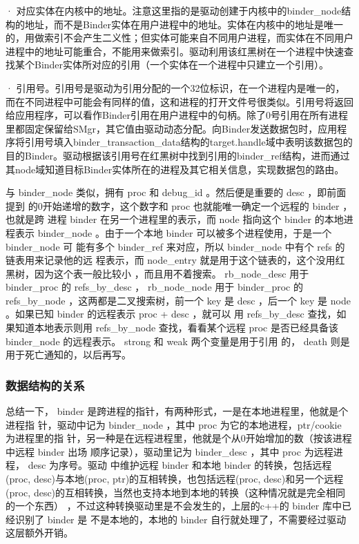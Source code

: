 \documentclass[a4paper,11pt]{article}
\begin{document}
· 对应实体在内核中的地址。注意这里指的是驱动创建于内核中的binder_node结构的地址，而不是Binder实体在用户进程中的地址。实体在内核中的地址是唯一的，用做索引不会产生二义性；但实体可能来自不同用户进程，而实体在不同用户进程中的地址可能重合，不能用来做索引。驱动利用该红黑树在一个进程中快速查找某个Binder实体所对应的引用（一个实体在一个进程中只建立一个引用）。

· 引用号。引用号是驱动为引用分配的一个32位标识，在一个进程内是唯一的，而在不同进程中可能会有同样的值，这和进程的打开文件号很类似。引用号将返回给应用程序，可以看作Binder引用在用户进程中的句柄。除了0号引用在所有进程里都固定保留给SMgr，其它值由驱动动态分配。向Binder发送数据包时，应用程序将引用号填入binder_transaction_data结构的target.handle域中表明该数据包的目的Binder。驱动根据该引用号在红黑树中找到引用的binder_ref结构，进而通过其node域知道目标Binder实体所在的进程及其它相关信息，实现数据包的路由。


与 binder_node 类似，拥有 proc 和 debug_id 。然后便是重要的 desc ，即前面提到
的0开始递增的数字，这个数字和 proc 也就能唯一确定一个远程的 binder ，也就是跨
进程 binder 在另一个进程里的表示，而 node 指向这个 binder 的本地进程表示
binder_node 。由于一个本地 binder 可以被多个进程使用，于是一个 binder_node 可
能有多个 binder_ref 来对应，所以 binder_node 中有个 refs 的链表用来记录他的远
程表示，而 node_entry 就是用于这个链表的，这个没用红黑树，因为这个表一般比较小
，而且用不着搜索。 rb_node_desc 用于 binder_proc 的 refs_by_desc ，
rb_node_node 用于 binder_proc 的 refs_by_node ，这两都是二叉搜索树，前一个 key
是 desc ，后一个 key 是 node 。如果已知 binder 的远程表示 proc + desc ，就可以
用 refs_by_desc 查找，如果知道本地表示则用 refs_by_node 查找，看看某个远程
proc 是否已经具备该 binder_node 的远程表示。 strong 和 weak 两个变量是用于引用
的， death 则是用于死亡通知的，以后再写。

\subsubsection{数据结构的关系}
总结一下， binder 是跨进程的指针，有两种形式，一是在本地进程里，他就是个进程指
针，驱动中记为 binder_node ，其中 proc 为它的本地进程，ptr/cookie 为进程里的指
针，另一种是在远程进程里，他就是个从0开始增加的数（按该进程中远程 binder 出场
顺序记录），驱动里记为 binder_desc ，其中 proc 为远程进程， desc 为序号。驱动
中维护远程 binder 和本地 binder 的转换，包括远程(proc, desc)与本地(proc,
ptr)的互相转换，也包括远程(proc, desc)和另一个远程(proc,
desc)的互相转换，当然也支持本地到本地的转换（这种情况就是完全相同的一个东西）
，不过这种转换驱动里是不会发生的，上层的c++的 binder 库中已经识别了 binder 是
不是本地的，本地的 binder 自行就处理了，不需要经过驱动这层额外开销。
\end{document}
